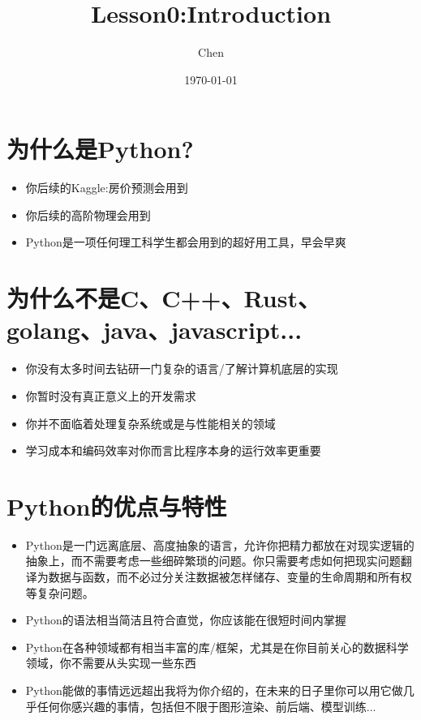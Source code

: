 \documentclass[utf8, 12pt, a4paper, oneside]{ctexart}
\title{Lesson0:Introduction}
\author{Chen}
\date{\today}
\begin{document}
\maketitle

\newpage

\section{为什么是Python?}
\begin{itemize}
    \item 你后续的Kaggle:房价预测会用到
    \item 你后续的高阶物理会用到
    \item Python是一项任何理工科学生都会用到的超好用工具，早会早爽
\end{itemize}

\newpage


\section{为什么不是C、C++、Rust、golang、java、javascript...}
\begin{itemize}
    \item 你没有太多时间去钻研一门复杂的语言/了解计算机底层的实现
    \item 你暂时没有真正意义上的开发需求
    \item 你并不面临着处理复杂系统或是与性能相关的领域
    \item 学习成本和编码效率对你而言比程序本身的运行效率更重要
\end{itemize}

\newpage


\section{Python的优点与特性}
\begin{itemize}
    \item Python是一门远离底层、高度抽象的语言，允许你把精力都放在对现实逻辑的抽象上，而不需要考虑一些细碎繁琐的问题。你只需要考虑如何把现实问题翻译为数据与函数，而不必过分关注数据被怎样储存、变量的生命周期和所有权等复杂问题。
    \item Python的语法相当简洁且符合直觉，你应该能在很短时间内掌握
    \item Python在各种领域都有相当丰富的库/框架，尤其是在你目前关心的数据科学领域，你不需要从头实现一些东西
    \item Python能做的事情远远超出我将为你介绍的，在未来的日子里你可以用它做几乎任何你感兴趣的事情，包括但不限于图形渲染、前后端、模型训练...
\end{itemize}
\end{document}
